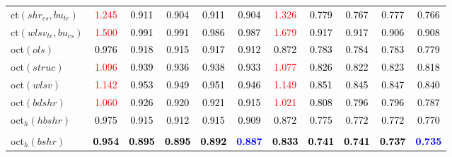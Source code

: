 \begin{tabular}[t]{l|>{}cccc>{}c|ccccc}
ct$(shr_{cs}, bu_{te})$ & \textcolor{red}{1.245} & \textcolor{black}{0.911} & \textcolor{black}{0.904} & \textcolor{black}{0.911} & \textcolor{black}{0.904} & \textcolor{red}{1.326} & \textcolor{black}{0.779} & \textcolor{black}{0.767} & \textcolor{black}{0.777} & \textcolor{black}{0.766}\\
ct$(wlsv_{te}, bu_{cs})$ & \textcolor{red}{1.500} & \textcolor{black}{0.991} & \textcolor{black}{0.991} & \textcolor{black}{0.986} & \textcolor{black}{0.987} & \textcolor{red}{1.679} & \textcolor{black}{0.917} & \textcolor{black}{0.917} & \textcolor{black}{0.906} & \textcolor{black}{0.908}\\
oct$(ols)$ & \textcolor{black}{0.976} & \textcolor{black}{0.918} & \textcolor{black}{0.915} & \textcolor{black}{0.917} & \textcolor{black}{0.912} & \textcolor{black}{0.872} & \textcolor{black}{0.783} & \textcolor{black}{0.784} & \textcolor{black}{0.783} & \textcolor{black}{0.779}\\
oct$(struc)$ & \textcolor{red}{1.096} & \textcolor{black}{0.939} & \textcolor{black}{0.936} & \textcolor{black}{0.938} & \textcolor{black}{0.933} & \textcolor{red}{1.077} & \textcolor{black}{0.826} & \textcolor{black}{0.822} & \textcolor{black}{0.823} & \textcolor{black}{0.818}\\
oct$(wlsv)$ & \textcolor{red}{1.142} & \textcolor{black}{0.953} & \textcolor{black}{0.949} & \textcolor{black}{0.951} & \textcolor{black}{0.946} & \textcolor{red}{1.149} & \textcolor{black}{0.851} & \textcolor{black}{0.845} & \textcolor{black}{0.847} & \textcolor{black}{0.840}\\
oct$(bdshr)$ & \textcolor{red}{1.060} & \textcolor{black}{0.926} & \textcolor{black}{0.920} & \textcolor{black}{0.921} & \textcolor{black}{0.915} & \textcolor{red}{1.021} & \textcolor{black}{0.808} & \textcolor{black}{0.796} & \textcolor{black}{0.796} & \textcolor{black}{0.787}\\
oct$_h(hbshr)$ & \textcolor{black}{0.975} & \textcolor{black}{0.915} & \textcolor{black}{0.912} & \textcolor{black}{0.915} & \textcolor{black}{0.909} & \textcolor{black}{0.872} & \textcolor{black}{0.775} & \textcolor{black}{0.772} & \textcolor{black}{0.772} & \textcolor{black}{0.770}\\[-1.5ex]
\hline\\[-1.5ex]
oct$_h(bshr)$ & \textcolor{black}{\textbf{0.954}} & \textcolor{black}{\textbf{0.895}} & \textcolor{black}{\textbf{0.895}} & \textcolor{black}{\textbf{0.892}} & \textcolor{blue}{\textbf{0.887}} & \textcolor{black}{\textbf{0.833}} & \textcolor{black}{\textbf{0.741}} & \textcolor{black}{\textbf{0.741}} & \textcolor{black}{\textbf{0.737}} & \textcolor{blue}{\textbf{0.735}}\\

\end{tabular}
